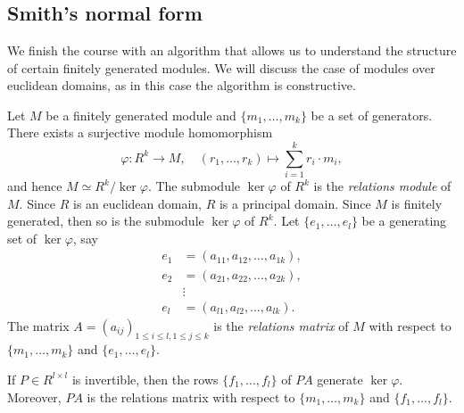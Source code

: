 \section{}

\subsection{Smith's normal form}

We finish the course with an algorithm that allows us to understand the
structure of certain finitely generated modules.  We will discuss the case of
modules over euclidean domains, as in this case the algorithm is constructive. 


Let $M$ be a finitely generated module and $\{m_1,\dots,m_k\}$ be a set of
generators.  There exists a surjective module homomorphism 
\[
	\varphi\colon R^k\to M, 
	\quad
	(r_1,\dots,r_k)\mapsto \sum_{i=1}^k r_i\cdot m_i,
\]
and hence 
$M\simeq R^k/\ker\varphi$. 
The submodule $\ker\varphi$ of $R^k$ is the \emph{relations module} of $M$. 
Since $R$ is an euclidean domain, $R$ is a principal domain. Since 
$M$ is finitely generated, then so is the submodule $\ker\varphi$ of $R^k$. Let 
$\{e_1,\dots,e_l\}$ be a generating set of $\ker\varphi$, say 
\begin{align*}
e_1&=(a_{11},a_{12},\dots,a_{1k}),\\
e_2&=(a_{21},a_{22},\dots,a_{2k}),\\
&\vdots\\
e_l&=(a_{l1},a_{l2},\dots,a_{lk}).	
\end{align*}
The matrix $A=(a_{ij})_{1\leq i\leq l,1\leq j\leq k}$ is the 
\emph{relations matrix} of $M$ with respect to $\{m_1,\dots,m_k\}$ 
and $\{e_1,\dots,e_l\}$. 

\begin{claim}
		If $P\in R^{l\times l}$ is invertible, then the rows
		$\{f_1,\dots,f_l\}$ of $PA$ generate $\ker\varphi$. Moreover, $PA$ is
		the relations matrix with respect to $\{m_1,\dots,m_k\}$ and
		$\{f_1,\dots,f_l\}$. 
\end{claim}


